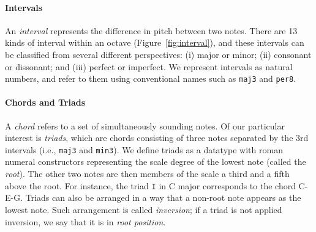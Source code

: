 

\paragraph{Intervals}

\Interval

An \emph{interval} represents the difference in pitch between
two notes.
There are 13 kinds of interval within an octave
(Figure~\ref{fig:interval}), and these intervals can be classified from
several different perspectives:
(i) major or minor; (ii) consonant or dissonant; and (iii) perfect
or imperfect.
We represent intervals as natural numbers, and refer to them using
conventional names such as \texttt{maj3} and \texttt{per8}.

\paragraph{Chords and Triads}

A \emph{chord} refers to a set of simultaneously sounding notes.
Of our particular interest is \emph{triads}, which are
chords consisting of three notes separated by the 3rd intervals (i.e.,
\texttt{maj3} and \texttt{min3}).
We define triads as a datatype with roman numeral constructors
representing the scale degree of the lowest note (called the \emph{root}).
The other two notes are then members of the scale a third and a fifth
above the root.
For instance, the triad \texttt{I} in C major corresponds to the chord
C-E-G.
Triads can also be arranged in a way that a non-root note appears as
the lowest note.
Such arrangement is called \emph{inversion}; if a triad is not applied
inversion, we say that it is in \emph{root position}.
